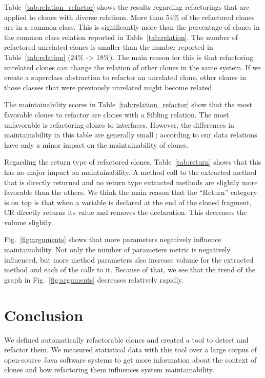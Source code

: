 \documentclass[a4paper,UKenglish,cleveref, autoref, thm-restate,authorcolumns]{lipics-v2019}
\begin{document}
Table~\ref{tab:relation_refactor} shows the results regarding refactorings that are applied to clones with diverse relations. More than 54\% of the refactored clones are in a common class. This is significantly more than the percentage of clones in the common class relation reported in Table~\ref{tab:relation}. The number of refactored unrelated clones is smaller than the number reported in Table~\ref{tab:relation} (24\% -> 18\%). The main reason for this is that refactoring unrelated clones can change the relation of other clones in the same system. If we create a superclass abstraction to refactor an unrelated clone, other clones in those classes that were previously unrelated might become related.

The maintainability scores in Table~\ref{tab:relation_refactor} show that the most favorable clones to refactor are clones with a Sibling relation. The most unfavorable is refactoring clones to interfaces. However, the differences in maintainability in this table are generally small %
; according to our data relations have only a minor impact on the maintainability of clones.

Regarding the return type of refactored clones, Table~\ref{tab:return} shows that this has no major impact on maintainability. A method call to the extracted method that is directly returned and no return type extracted methods are slightly more favorable than the others. We think the main reason that the ``Return'' category is on top is that when a variable is declared at the end of the cloned fragment, CR directly returns its value and removes the declaration. This decreases the volume slightly.

Fig.~\ref{fig:arguments} shows that more parameters negatively influence maintainability. Not only the %
number of parameters metric is negatively influenced, but more method parameters also increase volume for the extracted method and each of the calls to it. Because of that, we see that the trend of the graph in Fig.~\ref{fig:arguments} decreases relatively rapidly.

\section{Conclusion} \label{sec:conclusion}
We defined automatically refactorable clones and created a tool to detect and refactor them. We measured statistical data with this tool over a large corpus of open-source Java software systems to get more information about the context of clones and how refactoring them influences system maintainability.
\end{document}
